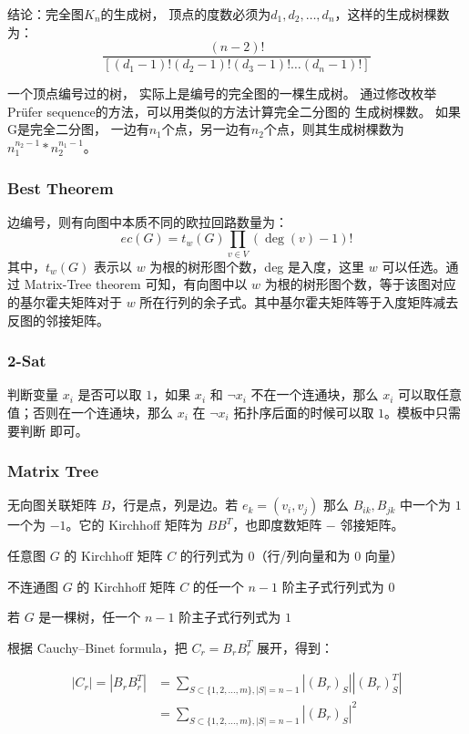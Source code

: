 结论：完全图$K_n$的生成树， 顶点的度数必须为$d_1, d_2, \ldots, d_n$，这样的生成树棵数为：
$$ \frac{(n-2)!}{[(d_1 - 1)! (d_2 - 1)! (d_3 - 1)! \ldots (d_n - 1)!]} $$

一个顶点编号过的树， 实际上是编号的完全图的一棵生成树。 通过修改枚举Prüfer sequence的方法，可以用类似的方法计算完全二分图的
生成树棵数。 如果G是完全二分图， 一边有$n_1$个点，另一边有$n_2$个点，则其生成树棵数为 $n_1 ^ {n_2 - 1} * n_2 ^ {n_1 - 1}$。

\subsubsection{Best Theorem}

边编号，则有向图中本质不同的欧拉回路数量为：
$$
ec(G) = t_w(G) \prod_{v \in V}{(\deg(v) - 1)!}
$$
其中，$t_w(G)$ 表示以 $w$ 为根的树形图个数，deg 是入度，这里 $w$ 可以任选。通过 Matrix-Tree theorem 可知，有向图中以 $w$ 为根的树形图个数，等于该图对应的基尔霍夫矩阵对于 $w$ 所在行列的余子式。其中基尔霍夫矩阵等于入度矩阵减去反图的邻接矩阵。

\subsubsection{2-Sat}

判断变量 $x_i$ 是否可以取 $1$，如果 $x_i$ 和 $\lnot x_i$ 不在一个连通块，那么 $x_i$ 可以取任意值；否则在一个连通块，那么 $x_i$ 在 $\lnot x_i$ 拓扑序后面的时候可以取 $1$。模板中只需要判断  即可。

\subsubsection{Matrix Tree}

无向图关联矩阵 $B$，行是点，列是边。若 $e_k=(v_i,v_j)$ 那么 $B_{ik},B_{jk}$ 中一个为 $1$ 一个为 $-1$。它的 Kirchhoff 矩阵为 $BB^T$，也即度数矩阵 $-$ 邻接矩阵。

任意图 $G$ 的 Kirchhoff 矩阵 $C$ 的行列式为 $0$（行/列向量和为 $0$ 向量）

不连通图 $G$ 的 Kirchhoff 矩阵 $C$ 的任一个 $n-1$ 阶主子式行列式为 $0$

若 $G$ 是一棵树，任一个 $n-1$ 阶主子式行列式为 $1$

根据 Cauchy–Binet formula，把 $C_r=B_rB_r^T$ 展开，得到：

$$
\begin{aligned}
|C_r|=|B_rB_r^T|&=\sum_{S\subset \{1,2,\dots,m\},|S|=n-1}|(B_r)_S||(B_r)_S^T|\\
&=\sum_{S\subset \{1,2,\dots,m\},|S|=n-1}|(B_r)_S|^2
\end{aligned}
$$

